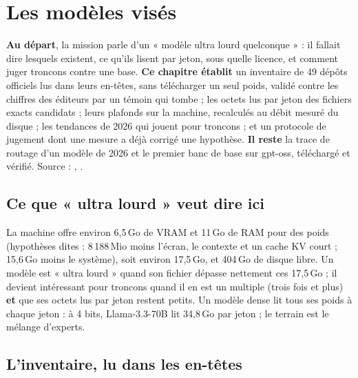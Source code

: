 \chapter{Les modèles visés}\label{ch:modeles}

\begin{origine}
\textbf{Au départ}, la mission parle d'un « modèle ultra lourd quelconque » : il fallait dire lesquels existent, ce qu'ils lisent par jeton, sous quelle licence, et comment juger troncons contre une base.
\textbf{Ce chapitre établit} un inventaire de 49 dépôts officiels lus dans leurs en-têtes, sans télécharger un seul poids, validé contre les chiffres des éditeurs par un témoin qui tombe ; les octets lus par jeton des fichiers exacts candidats ; leurs plafonds sur la machine, recalculés au débit mesuré du disque ; les tendances de 2026 qui jouent pour troncons ; et un protocole de jugement dont une mesure a déjà corrigé une hypothèse.
\textbf{Il reste} la trace de routage d'un modèle de 2026 et le premier banc de base sur gpt-oss, téléchargé et vérifié.
Source : , .
\end{origine}

\section{Ce que « ultra lourd » veut dire ici}

La machine offre environ 6,5\,Go de VRAM et 11\,Go de RAM pour des poids (hypothèses dites : 8\,188\,Mio moins l'écran, le contexte et un cache KV court ; 15,6\,Go moins le système), soit environ 17,5\,Go, et 404\,Go de disque libre. Un modèle est « ultra lourd » quand son fichier dépasse nettement ces 17,5\,Go ; il devient intéressant pour troncons quand il en est un multiple (trois fois et plus) \textbf{et} que ses octets lus par jeton restent petits. Un modèle dense lit tous ses poids à chaque jeton : à 4 bits, Llama-3.3-70B lit 34,8\,Go par jeton \calc ; le terrain est le mélange d'experts.

\section{L'inventaire, lu dans les en-têtes}\label{sec:inventaire}

